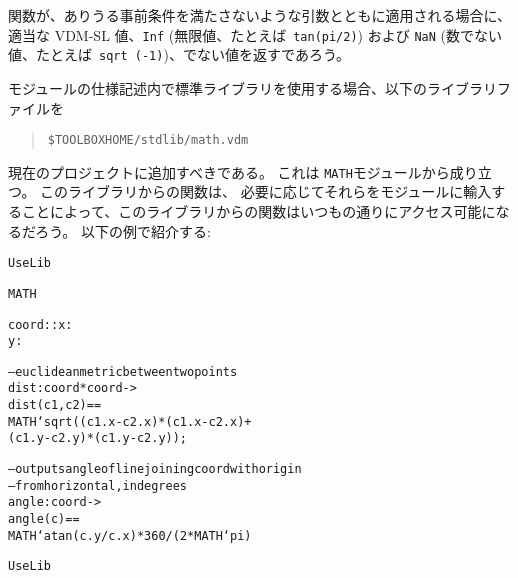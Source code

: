 \documentclass[\pformat,12pt]{jarticle}
\newcommand{\vdmslpp}[2]{%
#1
}
\newcommand{\vdmsl}{VDM-SL}
\newcommand{\vdmpp}{VDM++}
\begin{document}
関数が、ありうる事前条件を満たさないような引数とともに適用される場合に、適当な\vdmslpp{\vdmsl}{\vdmpp} 値、{\tt Inf} (無限値、たとえば\ {\tt  tan(pi/2)}) および {\tt NaN} (数でない値、たとえば\ {\tt sqrt (-1)})、でない値を返すであろう。


% 
% 
% 
% 
% 
% 
% 
% 
モジュールの仕様記述内で標準ライブラリを使用する場合、以下のライブラリファイルを
\begin{quote}
\verb+$TOOLBOXHOME/stdlib/math.vdm+
\end{quote}
現在のプロジェクトに追加すべきである。
これは \texttt{MATH}モジュールから成り立つ。
このライブラリからの関数は、
必要に応じてそれらをモジュールに輸入することによって、このライブラリからの関数はいつもの通りにアクセス可能になるだろう。
以下の例で紹介する:

\begin{alltt}
 UseLib

     MATH 



  coord :: x : 
           y : 


  -- euclidean metric between two points
  dist : coord * coord -> 
  dist (c1,c2) ==
    MATH`sqrt((c1.x - c2.x) * (c1.x - c2.x) +
              (c1.y - c2.y) * (c1.y - c2.y));

  -- outputs angle of line joining coord with origin
  -- from horizontal, in degrees
  angle : coord -> 
  angle (c) ==
    MATH`atan (c.y / c.x) * 360 / ( 2 * MATH`pi)

 UseLib
\end{alltt}
\end{document}
